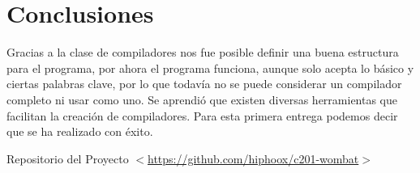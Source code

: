 \documentclass{article}
\begin{document}
\section{Conclusiones}

Gracias a la clase de compiladores nos fue posible definir una buena estructura
para el programa, por ahora el programa funciona, aunque solo acepta lo básico
y ciertas palabras clave, por lo que todavía no se puede considerar un compilador
completo ni usar como uno. Se aprendió que existen diversas herramientas que
facilitan la creación de compiladores. Para esta primera entrega podemos decir
que se ha realizado con éxito.


\appendix
\addappheadtotoc
\appendixpage
Repositorio del Proyecto \hfill$<$\url{https://github.com/hiphoox/c201-wombat}$>$
\end{document}
